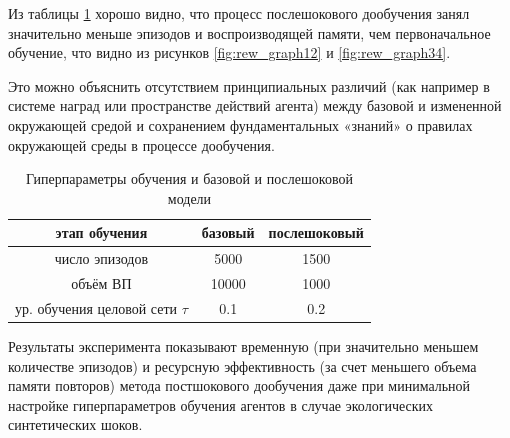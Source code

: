 Из таблицы \ref{tab:retrain_vs} хорошо видно, что процесс послешокового дообучения занял значительно меньше эпизодов и воспроизводящей памяти,
чем первоначальное обучение, что видно из рисунков \ref{fig:rew_graph12} и \ref{fig:rew_graph34}.

Это можно объяснить отсутствием принципиальных различий (как например в системе наград или пространстве действий агента) между базовой и
измененной окружающей средой и сохранением фундаментальных «знаний» о правилах окружающей среды в процессе дообучения.

\begin{table}[h]
    \centering
    \begin{tabular}{|c|c|c|}
        \hline
        этап обучения & базовый & послешоковый \\ \hline
        число эпизодов & 5000 & 1500 \\ \hline
        объём ВП & 10000 & 1000 \\ \hline
        ур. обучения целовой сети $\tau$ & 0.1 & 0.2 \\ \hline
    \end{tabular}
    \caption{Гиперпараметры обучения и базовой и послешоковой модели}
    \label{tab:retrain_vs}
\end{table}

Результаты эксперимента показывают временную (при значительно меньшем количестве эпизодов) и ресурсную
эффективность (за счет меньшего объема памяти повторов) метода постшокового дообучения даже при
минимальной настройке гиперпараметров обучения агентов в случае экологических синтетических шоков.